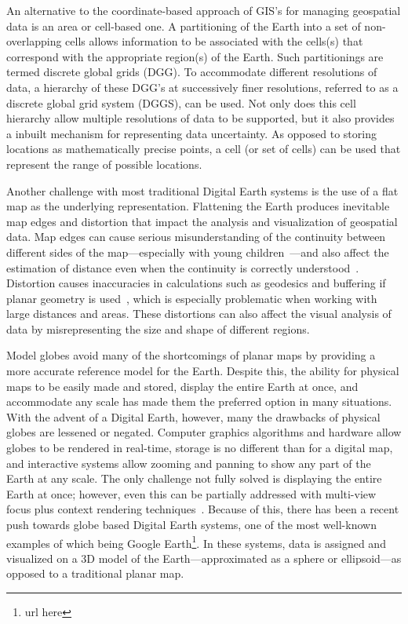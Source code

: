 An alternative to the coordinate-based approach of GIS's for managing geospatial data is an area or cell-based one.
A partitioning of the Earth into a set of non-overlapping cells allows information to be associated with the cells(s) that correspond with the appropriate region(s) of the Earth.
Such partitionings are termed discrete global grids (DGG).
To accommodate different resolutions of data, a hierarchy of these DGG's at successively finer resolutions, referred to as a discrete global grid system (DGGS), can be used.
Not only does this cell hierarchy allow multiple resolutions of data to be supported, but it also provides a inbuilt mechanism for representing data uncertainty.
As opposed to storing locations as mathematically precise points, a cell (or set of cells) can be used that represent the range of possible locations.


Another challenge with most traditional Digital Earth systems is the use of a flat map as the underlying representation.
Flattening the Earth produces inevitable map edges and distortion that impact the analysis and visualization of geospatial data.
Map edges can cause serious misunderstanding of the continuity between different sides of the map---especially with young children~\cite{hennerdal2015beyond}---and also affect the estimation of distance even when the continuity is correctly understood~\cite{hruby20182000}.
Distortion causes inaccuracies in calculations such as geodesics and buffering if planar geometry is used~\cite{flaterbuffering}, which is especially problematic when working with large distances and areas.
These distortions can also affect the visual analysis of data by misrepresenting the size and shape of different regions.


Model globes avoid many of the shortcomings of planar maps by providing a more accurate reference model for the Earth.
Despite this, the ability for physical maps to be easily made and stored, display the entire Earth at once, and accommodate any scale has made them the preferred option in many situations.
With the advent of a Digital Earth, however, many the drawbacks of physical globes are lessened or negated.
Computer graphics algorithms and hardware allow globes to be rendered in real-time, storage is no different than for a digital map, and interactive systems allow zooming and panning to show any part of the Earth at any scale.
The only challenge not fully solved is displaying the entire Earth at once; however, even this can be partially addressed with multi-view focus plus context rendering techniques~\cite{mark-sherlock}.
Because of this, there has been a recent push towards globe based Digital Earth systems, one of the most well-known examples of which being Google Earth\footnote{url here}.
In these systems, data is assigned and visualized on a 3D model of the Earth---approximated as a sphere or ellipsoid---as opposed to a traditional planar map.

